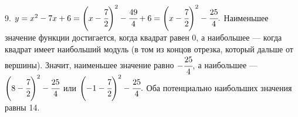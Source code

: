 9. $y=x^2-7x+6=\left(x-\cfrac{7}{2}\right)^2-\cfrac{49}{4}+6=\left(x-\cfrac{7}{2}\right)^2-\cfrac{25}{4}.$ Наименьшее значение функции достигается, когда квадрат равен 0, а наибольшее --- когда квадрат имеет наибольший модуль (в том из концов отрезка, который дальше от вершины). Значит, наименьшее значение равно $-\cfrac{25}{4},$ а наибольшее ---
$\left(8-\cfrac{7}{2}\right)^2-\cfrac{25}{4}$ или $\left(-1-\cfrac{7}{2}\right)^2-\cfrac{25}{4}.$ Оба потенциально наибольших значения равны 14.\newpage\noindent
